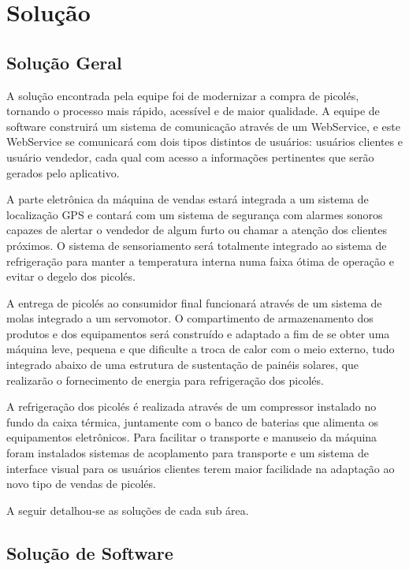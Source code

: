 \chapter{Solução}

\section{Solução Geral}

A solução encontrada pela equipe foi de modernizar a compra de picolés, tornando o processo mais rápido, acessível e de maior qualidade. A equipe de software construirá um sistema de comunicação através de um WebService, e este WebService se comunicará com dois tipos distintos de usuários: usuários clientes e usuário vendedor, cada qual com acesso a informações pertinentes que serão gerados pelo aplicativo.

A parte eletrônica da máquina de vendas estará integrada a um sistema de localização GPS e contará com um sistema de segurança com alarmes sonoros capazes de alertar o vendedor de algum furto ou chamar a atenção dos clientes próximos. O sistema de sensoriamento será totalmente integrado ao sistema de refrigeração para manter a temperatura interna numa faixa ótima de operação e evitar o degelo dos picolés. 

A entrega de picolés ao consumidor final funcionará através de um sistema de molas integrado a um servomotor. O compartimento de armazenamento dos produtos e dos equipamentos será construído e adaptado a fim de se obter uma máquina leve, pequena e que dificulte a troca de calor com o meio externo, tudo integrado abaixo de uma estrutura de sustentação de painéis solares, que realizarão o fornecimento de energia para refrigeração dos picolés.

A refrigeração dos picolés é realizada através de um compressor instalado no fundo da caixa térmica,  juntamente com o banco de baterias que alimenta os equipamentos eletrônicos. Para facilitar o transporte e manuseio da máquina foram instalados sistemas de acoplamento para transporte e um sistema de interface visual para os usuários clientes terem maior facilidade na adaptação ao novo tipo de vendas de picolés.

A seguir detalhou-se as soluções de cada sub área.


\section{Solução de Software}

